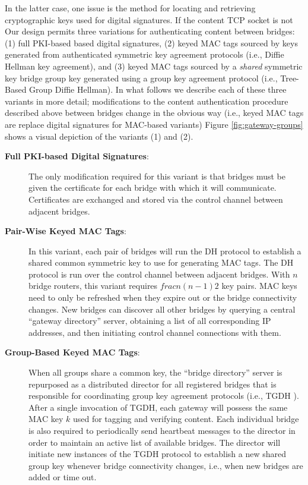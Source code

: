 In the latter case, one issue is the method for locating and retrieving cryptographic keys used for digital signatures. If the content TCP socket is not Our design permits three variations for authenticating content between bridges: (1) full PKI-based based digital signatures, (2) keyed MAC tags sourced by keys generated from authenticated symmetric key agreement protocols (i.e., Diffie Hellman key agreement), and (3) keyed MAC tags sourced by a \emph{shared} symmetric key bridge group key generated using a group key agreement protocol (i.e., Tree-Based Group Diffie Hellman). In what follows we describe each of these three variants in more detail; modifications to the content authentication procedure described above between bridges change in the obvious way (i.e., keyed MAC tags are replace digital signatures for MAC-based variants) Figure \ref{fig:gateway-groups} shows a visual depiction of the variants (1) and (2). \\

\begin{description}

	\item[\textbf{Full PKI-based Digital Signatures}:] The only modification required for this variant is that bridges must be given the certificate for each bridge with which it will communicate. Certificates are exchanged and stored via the control channel between adjacent bridges.

	\item[\textbf{Pair-Wise Keyed MAC Tags}:] In this variant, each pair of bridges will run the DH protocol to establish a shared common symmetric key to use for generating MAC tags. The DH protocol is run over the control channel between adjacent bridges. With $n$ bridge routers, this variant requires $frac{n(n-1)}{2}$ key pairs. MAC keys need to only be refreshed when they expire out or the bridge connectivity changes. New bridges can discover all other bridges by querying a central ``gateway directory'' server, obtaining a list of all corresponding IP addresses, and then initiating control channel connections with them.

	\item[\textbf{Group-Based Keyed MAC Tags}:] When all groups share a common key, the ``bridge directory'' server is repurposed as a distributed director for all registered bridges that is responsible for coordinating group key agreement protocols (i.e., TGDH \cite{kim2004tree}). After a single invocation of TGDH, each gateway will possess the same MAC key $k$ used for tagging and verifying content. Each individual bridge is also required to periodically send heartbeat messages to the director in order to maintain an active list of available bridges. The director will initiate new instances of the TGDH protocol to establish a new shared group key whenever bridge connectivity changes, i.e., when new bridges are added or time out. 

\end{description}

